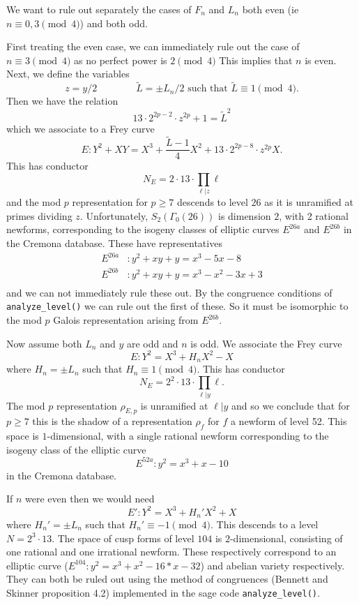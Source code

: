 \documentclass[12pt]{article}
\begin{document}
\begin{enumerate}
We want to rule out separately the cases of $F_n$ and $L_n$ both even (ie $n \equiv 0,3 \pmod{4}$) and both odd.

First treating the even case, we can immediately rule out the case of $n \equiv 3 \pmod{4}$ as no perfect power is $2 \pmod{4}$  This implies that $n$ is even.  Next, we define the variables
\[ z = y/2 \qquad \qquad \tilde{L} = \pm L_n/2 \text{ such that } \tilde{L} \equiv 1 \pmod{4}. \]
Then we have the relation
\[ 13 \cdot 2^{2p-2} \cdot z^{2p}+1 = \tilde{L}^2 \] 
which we associate to a Frey curve
\[E: Y^2 +XY = X^3 +\frac{\tilde{L}-1}{4} X^2 +13 \cdot 2^{2p-8} \cdot z^{2p} X .\]
This has conductor
\[ N_E = 2 \cdot 13 \cdot \prod_{\ell | z} \ell \]
and the mod $p$ representation for $p \geq 7$ descends to level $26$ as it is unramified at primes dividing $z$.  Unfortunately, $S_2(\Gamma_0(26))$ is dimension $2$, with 2 rational newforms, corresponding to the isogeny classes of elliptic curves $E^{26a}$ and $E^{26b}$ in the Cremona database.  These have representatives
\begin{align*}
E^{26a} & : y^2 + xy + y = x^3 - 5x - 8 \\
E^{26b} & : y^2 + xy + y = x^3 - x^2 - 3x + 3 \\
\end{align*}
and we can not immediately rule these out.  By the congruence conditions of \texttt{analyze\_level()} we can rule out the first of these.  So it must be isomorphic to the mod $p$ Galois representation arising from $E^{26b}$.

Now assume both $L_n$ and $y$ are odd and $n$ is odd.  We associate the Frey curve
\[ E: Y^2 = X^3 + H_nX^2 - X \]
where $H_n = \pm L_n$ such that $H_n \equiv 1 \pmod{4}$.  
This has conductor
\[ N_E = 2^2 \cdot 13 \cdot \prod_{\ell | y} \ell. \]
The mod $p$ representation $\rho_{E,p}$ is unramified at $\ell | y$ and so we conclude that for $p \geq 7$ this is the shadow of a representation $\rho_f$ for $f$ a newform of level 52.  This space is $1$-dimensional, with a single rational newform corresponding to the isogeny class of the elliptic curve
\[ E^{52a}: y^2 = x^3 + x - 10\]
in the Cremona database.

If $n$ were even then we would need
\[ E': Y^2 = X^3 + H_n'X^2 + X \]
where $H_n' = \pm L_n$ such that $H_n' \equiv -1 \pmod{4}$.  This descends to a level $N = 2^3 \cdot 13$.  The space of cusp forms of level $104$ is $2$-dimensional, consisting of one rational and one irrational newform.  These respectively correspond to an elliptic curve ($E^{104}: y^2 = x^3 + x^2 - 16*x - 32$) and abelian variety respectively.  They can both be ruled out using the method of congruences (Bennett and Skinner proposition 4.2) implemented in the sage code \texttt{analyze\_level()}.




\end{enumerate}
\end{document}
